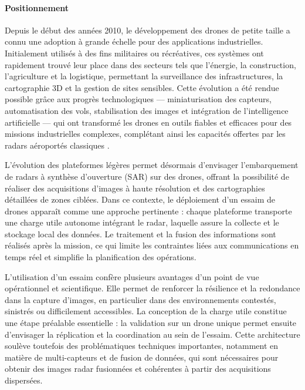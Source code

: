 \paragraph{Positionnement}

Depuis le début des années 2010, le développement des drones de petite taille a connu une adoption à grande échelle pour des applications industrielles. Initialement utilisés à des fins militaires ou récréatives, ces systèmes ont rapidement trouvé leur place dans des secteurs tels que l’énergie, la construction, l’agriculture et la logistique, permettant la surveillance des infrastructures, la cartographie 3D et la gestion de sites sensibles. Cette évolution a été rendue possible grâce aux progrès technologiques — miniaturisation des capteurs, automatisation des vols, stabilisation des images et intégration de l’intelligence artificielle — qui ont transformé les drones en outils fiables et efficaces pour des missions industrielles complexes, complétant ainsi les capacités offertes par les radars aéroportés classiques \cite{wikipedia_drone,wikipedia_dji_matrice,foxtech_drone}.

L’évolution des plateformes légères permet désormais d’envisager l’embarquement de radars à synthèse d’ouverture (SAR) sur des drones, offrant la possibilité de réaliser des acquisitions d’images à haute résolution et des cartographies détaillées de zones ciblées. Dans ce contexte, le déploiement d’un essaim de drones apparaît comme une approche pertinente : chaque plateforme transporte une charge utile autonome intégrant le radar, laquelle assure la collecte et le stockage local des données. Le traitement et la fusion des informations sont réalisés après la mission, ce qui limite les contraintes liées aux communications en temps réel et simplifie la planification des opérations.

L’utilisation d’un essaim confère plusieurs avantages d’un point de vue opérationnel et scientifique. Elle permet de renforcer la résilience et la redondance dans la capture d’images, en particulier dans des environnements contestés, sinistrés ou difficilement accessibles. La conception de la charge utile constitue une étape préalable essentielle : la validation sur un drone unique permet ensuite d’envisager la réplication et la coordination au sein de l’essaim. Cette architecture soulève toutefois des problématiques techniques importantes, notamment en matière de multi-capteurs et de fusion de données, qui sont nécessaires pour obtenir des images radar fusionnées et cohérentes à partir des acquisitions dispersées.


